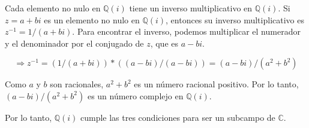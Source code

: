 Cada elemento no nulo en $\mathbb{Q}(i)$ tiene un inverso multiplicativo en $\mathbb{Q}(i)$. Si $z = a + bi$ es un elemento no nulo en $\mathbb{Q}(i)$, entonces su inverso multiplicativo es $z^{-1} = 1/(a+bi)$. Para encontrar el inverso, podemos multiplicar el numerador y el denominador por el conjugado de $z$, que es $a - bi$.

$$\Rightarrow z^{-1} = (1/(a+bi)) * ((a-bi)/(a-bi)) = (a - bi)/(a^{2} + b^{2})$$

Como $a$ y $b$ son racionales, $a^2 + b^2$ es un número racional positivo. Por lo tanto, $(a - bi)/(a^2 + b^2)$ es un número complejo en $\mathbb{Q}(i)$.

Por lo tanto, $\mathbb{Q}(i)$ cumple las tres condiciones para ser un subcampo de $\mathbb{C}$.